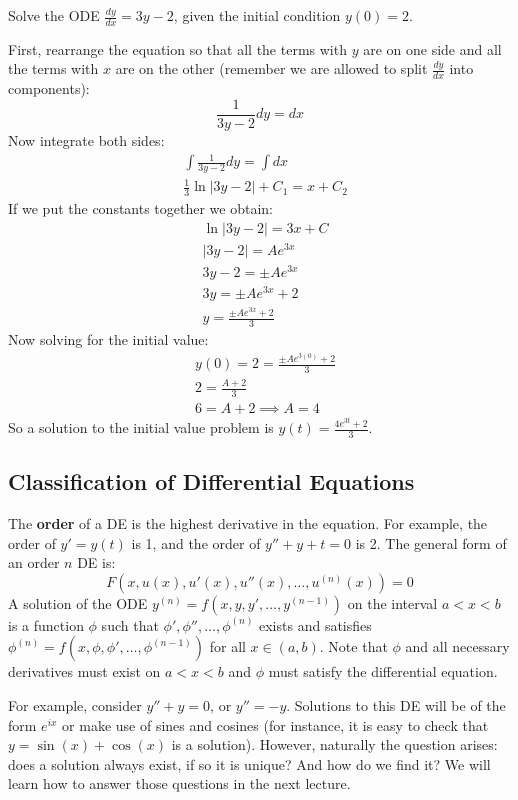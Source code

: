 \begin{example}
    Solve the ODE $\frac{dy}{dx} = 3y - 2$, given the initial condition $y(0) = 2$.
\end{example}
\begin{solution}
    First, rearrange the equation so that all the terms with $y$ are on one side and all the terms with $x$ are on the other (remember we are allowed to split $\frac{dy}{dx}$ into components):
    \[ \frac{1}{3y - 2}dy = dx \]
    Now integrate both sides:
    \begin{align*}
        & \int \frac{1}{3y - 2}dy = \int dx \\
        & \frac{1}{3} \ln|3y - 2| + C_1 = x + C_2
    \end{align*}
    If we put the constants together we obtain:
    \begin{align*}
        & \ln|3y - 2| = 3x + C \\
        & |3y - 2| = Ae^{3x} \\
        & 3y - 2 = \pm Ae^{3x} \\
        & 3y =  \pm Ae^{3x} + 2 \\
        & y = \frac{\pm Ae^{3x} + 2 }{3}
    \end{align*}
    Now solving for the initial value:
    \begin{align*}
        & y(0) = 2 = \frac{\pm Ae^{3(0)} + 2 }{3} \\
        & 2 = \frac{A + 2}{3} \\
        & 6 = A + 2 \implies A = 4
    \end{align*}
    So a solution to the initial value problem is $y(t) = \frac{4e^{3t} + 2}{3}$.
\end{solution}

\subsection{Classification of Differential Equations}

The \textbf{order} of a DE is the highest derivative in the equation. For example, the order of $y' = y(t)$ is 1, and the order of $y'' + y + t = 0$ is 2. The general form of an order $n$ DE is:
\[ F(x, u(x), u'(x), u''(x), \dots, u^{(n)}(x)) = 0\]
A solution of the ODE $y^{(n)} = f(x,y, y', \dots, y^{(n-1)})$ on the interval $a < x < b$ is a function $\phi$ such that $\phi', \phi'', \dots, \phi^{(n)}$ exists and satisfies $\phi^{(n)} = f(x, \phi, \phi', \dots, \phi^{(n-1)})$ for all $x \in (a, b)$. Note that $\phi$ and all necessary derivatives must exist on $a < x < b$ and $\phi$ must satisfy the differential equation.

For example, consider $y'' + y = 0$, or $y'' = -y$. Solutions to this DE will be of the form $e^{ix}$ or make use of sines and cosines (for instance, it is easy to check that $y = \sin(x) + \cos(x)$ is a solution). However, naturally the question arises: does a solution always exist, if so it is unique? And how do we find it? We will learn how to answer those questions in the next lecture. 

